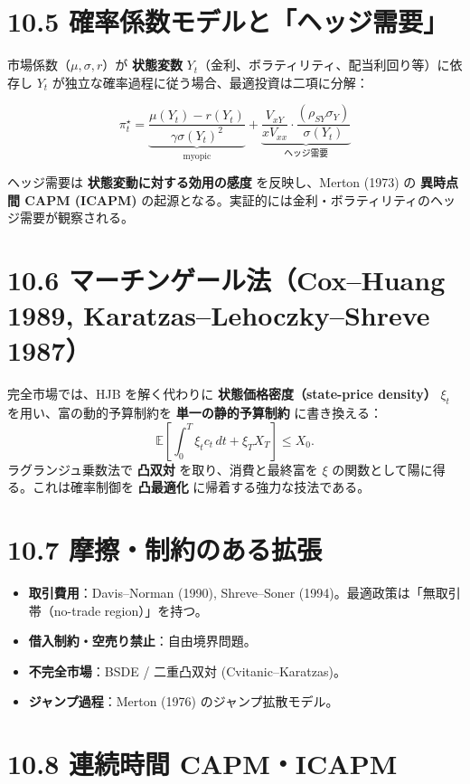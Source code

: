 \documentclass[11pt,a4paper]{report}
\begin{document}
\section{10.5 確率係数モデルと「ヘッジ需要」}

市場係数（$\mu, \sigma, r$）が \textbf{状態変数} $Y_t$（金利、ボラティリティ、配当利回り等）に依存し $Y_t$ が独立な確率過程に従う場合、最適投資は二項に分解：

\[ \pi^\star_t = \underbrace{\frac{\mu(Y_t) - r(Y_t)}{\gamma \sigma(Y_t)^2}}_{\text{myopic}} + \underbrace{\frac{V_{xY}}{x V_{xx}} \cdot \frac{(\rho_{SY} \sigma_Y)}{\sigma(Y_t)}}_{\text{ヘッジ需要}} \]

ヘッジ需要は \textbf{状態変動に対する効用の感度} を反映し、Merton (1973) の \textbf{異時点間 CAPM (ICAPM)} の起源となる。実証的には金利・ボラティリティのヘッジ需要が観察される。

\section{10.6 マーチンゲール法（Cox–Huang 1989, Karatzas–Lehoczky–Shreve 1987）}

完全市場では、HJB を解く代わりに \textbf{状態価格密度（state-price density）} $\xi_t$ を用い、富の動的予算制約を \textbf{単一の静的予算制約} に書き換える： \[ \mathbb{E}\left[\int_0^T \xi_t c_t \, dt + \xi_T X_T\right] \le X_0. \] ラグランジュ乗数法で \textbf{凸双対} を取り、消費と最終富を $\xi$ の関数として陽に得る。これは確率制御を \textbf{凸最適化} に帰着する強力な技法である。

\section{10.7 摩擦・制約のある拡張}

\begin{itemize}
\item \textbf{取引費用}：Davis–Norman (1990), Shreve–Soner (1994)。最適政策は「無取引帯（no-trade region）」を持つ。
\item \textbf{借入制約・空売り禁止}：自由境界問題。
\item \textbf{不完全市場}：BSDE / 二重凸双対 (Cvitanic–Karatzas)。
\item \textbf{ジャンプ過程}：Merton (1976) のジャンプ拡散モデル。
\end{itemize}

\section{10.8 連続時間 CAPM・ICAPM}
\end{document}
